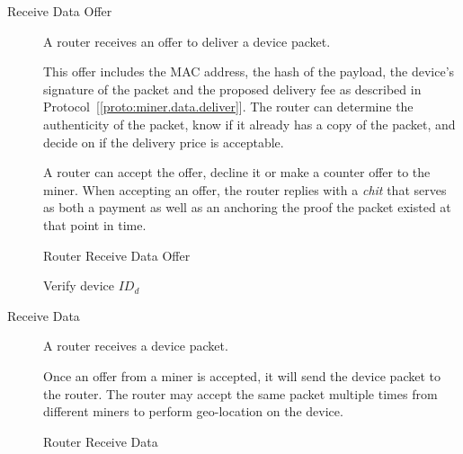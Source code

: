 \documentclass[10pt, nonatbib, nocopyrightspace, reprint]{sigplanconf}
\begin{document}
\begin{description}

    \item [Receive Data Offer] A router receives an offer to deliver a device packet.

      This offer includes the MAC address, the hash of the payload, the device's signature of the packet and the proposed delivery fee as described in Protocol~[\ref{proto:miner.data.deliver}]. The router can determine the authenticity of the packet, know if it already has a copy of the packet, and decide on if the delivery price is acceptable.

      A router can accept the offer, decline it or make a counter offer to the miner. When accepting an offer, the router replies with a \emph{chit} that serves as both a payment as well as an anchoring the proof the packet existed at that point in time.

    \begin{algorithm}[!htb]
      \DontPrintSemicolon
      \caption{Router Receive Data Offer}\label{proto:router.offer.recv}

       {
        Verify device $ID_d$ \;
      }
    \end{algorithm}
    \FloatBarrier


    \item [Receive Data] A router receives a device packet.

      Once an offer from a miner is accepted, it will send the device packet to the router. The router may accept the same packet multiple times from different miners to perform geo-location on the device.

    \begin{algorithm}[!htb]
      \DontPrintSemicolon
      \caption{Router Receive Data }\label{proto:router.data.recv}


\end{algorithm}
\end{description}
\end{document}
